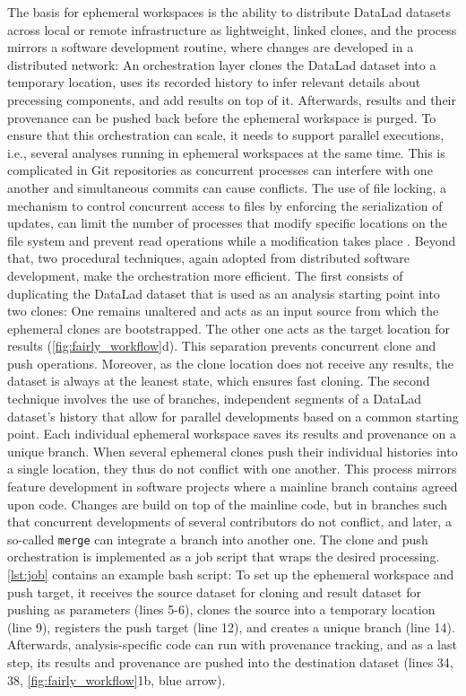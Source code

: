 The basis for ephemeral workspaces is the ability to distribute DataLad datasets across local or remote infrastructure as lightweight, linked clones, and the process mirrors a software development routine, where changes are developed in a distributed network:
An orchestration layer clones the DataLad dataset into a temporary location, uses its recorded history to infer relevant details about precessing components, and add results on top of it.
Afterwards, results and their provenance can be pushed back before the ephemeral workspace is purged.
To ensure that this orchestration can scale, it needs to support parallel executions, i.e., several analyses running in ephemeral workspaces at the same time.
This is complicated in Git repositories as concurrent processes can interfere with one another and simultaneous commits can cause conflicts.
The use of file locking, a mechanism to control concurrent access to files by enforcing the serialization of updates, can limit the number of processes that modify specific locations on the file system and prevent read operations while a modification takes place \citep{xoxa2015implementations}.
Beyond that, two procedural techniques, again adopted from distributed software development, make the orchestration more efficient.
The first consists of duplicating the DataLad dataset that is used as an analysis starting point into two clones: One remains unaltered and acts as an input source from which the ephemeral clones are bootstrapped.
The other one acts as the target location for results (\cref{fig:fairly_workflow}d).
This separation prevents concurrent clone and push operations.
Moreover, as the clone location does not receive any results, the dataset is always at the leanest state, which ensures fast cloning.
The second technique involves the use of branches, independent segments of a DataLad dataset's history that allow for parallel developments based on a common starting point.
Each individual ephemeral workspace saves its results and provenance on a unique branch.
When several ephemeral clones push their individual histories into a single location, they thus do not conflict with one another.
This process mirrors feature development in software projects where a mainline branch contains agreed upon code.
Changes are build on top of the mainline code, but in branches such that concurrent developments of several contributors do not conflict, and later, a so-called \texttt{merge} can integrate a branch into another one.
The clone and push orchestration is implemented as a job script that wraps the desired processing.
\cref{lst:job} contains an example bash script:
To set up the ephemeral workspace and push target, it receives the source dataset for cloning and result dataset for pushing as parameters (lines 5-6), clones the source into a temporary location (line 9), registers the push target (line 12), and creates a unique branch (line 14).
Afterwards, analysis-specific code can run with provenance tracking, and as a last step, its results and provenance are pushed into the destination dataset (lines 34, 38, \cref{fig:fairly_workflow}1b, blue arrow).\\

